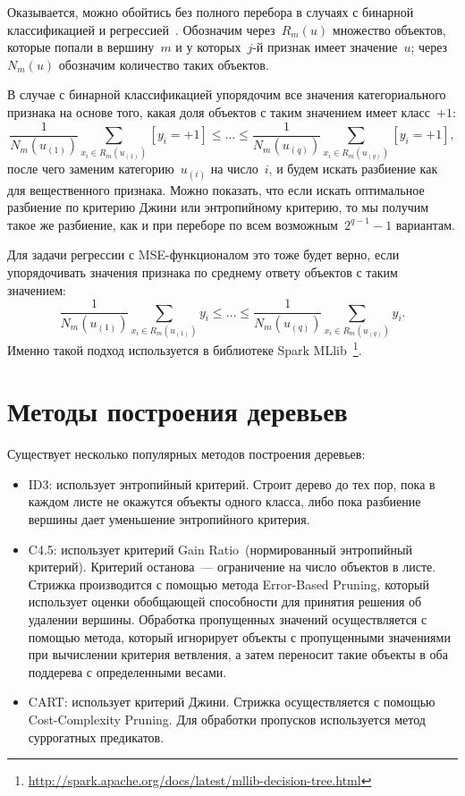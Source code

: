 \documentclass[12pt,fleqn]{article}
\begin{document}
Оказывается, можно обойтись без полного перебора в случаях с бинарной
классификацией и регрессией~\cite{hastie09esl}.
Обозначим через~$R_m(u)$ множество объектов, которые попали в вершину~$m$
и у которых~$j$-й признак имеет значение~$u$;
через~$N_m(u)$ обозначим количество таких объектов.

В случае с бинарной классификацией упорядочим все значения категориального
признака на основе того, какая доля объектов с таким значением имеет класс~$+1$:
\[
    \frac{1}{N_m(u_{(1)})}
    \sum_{x_i \in R_m(u_{(1)})}
        [y_i = +1]
    \leq
    \dots
    \leq
    \frac{1}{N_m(u_{(q)})}
    \sum_{x_i \in R_m(u_{(q)})}
        [y_i = +1],
\]
после чего заменим категорию~$u_{(i)}$ на число~$i$,
и будем искать разбиение как для вещественного признака.
Можно показать, что если искать оптимальное разбиение по критерию Джини или энтропийному критерию,
то мы получим такое же разбиение, как и при переборе по всем возможным~$2^{q - 1} - 1$ вариантам.

Для задачи регрессии с MSE-функционалом это тоже будет верно, если упорядочивать
значения признака по среднему ответу объектов с таким значением:
\[
    \frac{1}{N_m(u_{(1)})}
    \sum_{x_i \in R_m(u_{(1)})}
        y_i
    \leq
    \dots
    \leq
    \frac{1}{N_m(u_{(q)})}
    \sum_{x_i \in R_m(u_{(q)})}
        y_i.
\]
Именно такой подход используется в библиотеке
Spark MLlib~\footnote{\url{http://spark.apache.org/docs/latest/mllib-decision-tree.html}}.

\section{Методы построения деревьев}
Существует несколько популярных методов построения деревьев:
\begin{itemize}
    \item ID3: использует энтропийный критерий. Строит дерево до тех пор,
        пока в каждом листе не окажутся объекты одного класса,
        либо пока разбиение вершины дает уменьшение энтропийного критерия.
    \item C4.5: использует критерий Gain Ratio~(нормированный энтропийный критерий).
        Критерий останова~--- ограничение на число объектов в листе.
        Стрижка производится с помощью метода Error-Based Pruning,
        который использует оценки обобщающей способности для принятия решения об удалении вершины.
        Обработка пропущенных значений осуществляется с помощью метода,
        который игнорирует объекты с пропущенными значениями при вычислении критерия ветвления,
        а затем переносит такие объекты в оба поддерева с определенными весами.
    \item CART: использует критерий Джини. Стрижка осуществляется с помощью Cost-Complexity Pruning.
        Для обработки пропусков используется метод суррогатных предикатов.
\end{itemize}
\end{document}
